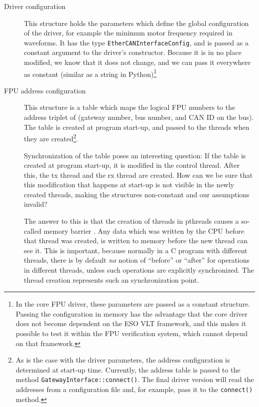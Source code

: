 \documentclass[fontsize=12,a4paper]{scrartcl}
\begin{document}
\begin{description}
\item[Driver configuration] This structure holds the parameters which
  define the global configuration of the driver, for example the
  minimum motor frequency required in waveforms. It has the type
  \texttt{EtherCANInterfaceConfig}, and is passed as a constant
  argument to the driver's constructor. Because it is in no place
  modified, we know that it does not change, and we can pass it
  everywhere as constant (similar as a string in Python)\footnote{In
    the core FPU driver, these parameters are passed as a constant
    structure. Passing the configuration in memory has the advantage
    that the core driver does not become dependent on the ESO VLT
    framework, and this makes it possible to test it within the FPU
    verification system, which cannot depend on that framework.}

\item[FPU address configuration] This structure is a table which maps
  the logical FPU numbers to the address triplet of (gateway number,
  bus number, and CAN ID on the bus). The table is created at program
  start-up, and passed to the threads when they are created\footnote{
    As is the case with the driver parameters, the address
    configuration is determined at start-up time. Currently, the
    address table is passed to the method
    \texttt{GatewayInterface::connect()}. The final driver version
    will read the addresses from a configuration file and, for
    example, pass it to the \texttt{connect()} method.}.

  Synchronization of the table poses an interesting question: If the
  table is created at program start-up, it is modified in the control
  thread. After this, the tx thread and the rx thread are created. How
  can we be sure that this modification that happens at start-up is
  not visible in the newly created threads, making the structures
  non-constant and our assumptions invalid?

  The answer to this is that the creation of threads in pthreads
  causes a so-called memory barrier
  \cite{WP:MemoryBarrier}\cite{Preshing:2012:MemoryBarriers}\cite[section
    7.1]{Butenhof:PwPT}.  Any data which was written by the CPU before
  that thread was created, is written to memory before the new thread
  can see it. This is important, because normally in a C program with
  different threads, there is by default \emph{no} notion of
  ``before'' or ``after'' for operations in different threads, unless
  such operations are explicitly synchronized. The thread creation
  represents such an synchronization point.



\end{description}
\end{document}

